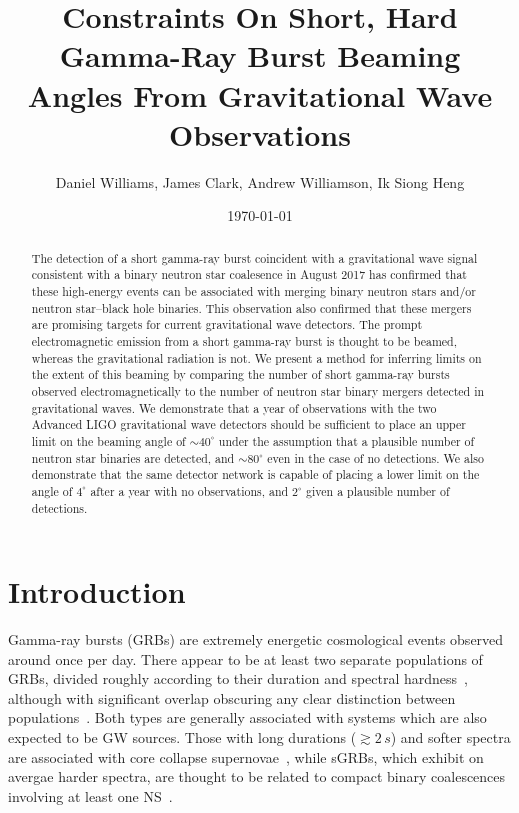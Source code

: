 \documentclass[twocolumn,nofootinbib]{revtex4-1}
\begin{document}
\title{Constraints On Short, Hard Gamma-Ray Burst Beaming Angles From
Gravitational Wave Observations}
\author{Daniel Williams, James Clark, Andrew Williamson, Ik Siong Heng}
\date{\today}

\begin{abstract}
The detection of a short gamma-ray burst coincident with a
gravitational wave signal consistent with a binary neutron star
coalesence in August 2017 has confirmed that these high-energy events
can be associated with merging binary neutron stars and/or neutron
star--black hole binaries. This observation also confirmed that these
mergers are promising targets for current gravitational wave
detectors. The prompt electromagnetic emission from a short gamma-ray
burst is thought to be beamed, whereas the gravitational radiation is
not. We present a method for inferring limits on the extent of this
beaming by comparing the number of short gamma-ray bursts observed
electromagnetically to the number of neutron star binary mergers
detected in gravitational waves. We demonstrate that a year of
observations with the two Advanced LIGO gravitational wave detectors
should be sufficient to place an upper limit on the beaming angle of
$\sim 40^{\circ}$ under the assumption that a plausible number of
neutron star binaries are detected, and $\sim 80^{\circ}$ even in the
case of no detections. We also demonstrate that the same detector
network is capable of placing a lower limit on the angle of
$4^{\circ}$ after a year with no observations, and $2^{\circ}$ given a
plausible number of detections.
\end{abstract}

\maketitle

\section{Introduction}

Gamma-ray bursts (GRBs) are extremely energetic cosmological events
observed around once per day. There appear to be at least two separate
populations of \acp{GRB}, divided roughly according to their duration and
spectral hardness~\cite{Kouveliotou:1993yx}, although with significant overlap
obscuring any clear distinction between
populations~\cite{Zhang:2009uf,Bromberg:2012gp}.  Both types are
generally associated with systems which are also expected to be
\ac{GW} sources.  Those with long durations ($\gtrsim 2\,s$) and
softer spectra are associated with core collapse
supernovae~\cite{Galama:1998ea,MacFadyen:1998vz,Woosley:2006fn}, while
\acp{sGRB}, which exhibit on avergae harder spectra, are thought to be
related to compact binary coalescences involving at least one
\ac{NS}~\cite{Eichler:1989ve,Paczynski:1991aq,Narayan:1992iy,Lee:2007js}.
\end{document}
